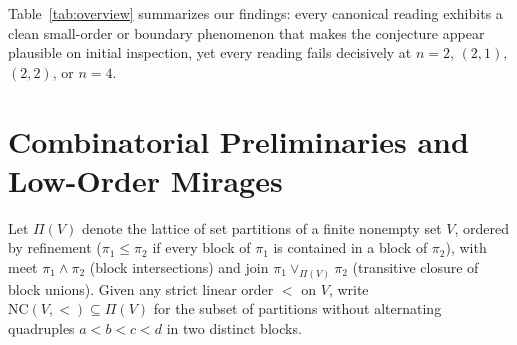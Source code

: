 \documentclass[11pt]{article}
\theoremstyle{plain}
\theoremstyle{definition}
\newcommand{\NC}{\mathrm{NC}}
\begin{document}
Table~\ref{tab:overview} summarizes our findings: every canonical reading exhibits a clean small-order or boundary phenomenon that makes the conjecture appear plausible on initial inspection, yet every reading fails decisively at $n = 2$, $(2, 1)$, $(2, 2)$, or $n = 4$.

\section{Combinatorial Preliminaries and Low-Order Mirages}

Let $\Pi(V)$ denote the lattice of set partitions of a finite nonempty set $V$, ordered by refinement ($\pi_1 \le \pi_2$ if every block of $\pi_1$ is contained in a block of $\pi_2$), with meet $\pi_1 \wedge \pi_2$ (block intersections) and join $\pi_1 \vee_{\Pi(V)} \pi_2$ (transitive closure of block unions). Given any strict linear order $<$ on $V$, write $\NC(V, <) \subseteq \Pi(V)$ for the subset of partitions without alternating quadruples $a < b < c < d$ in two distinct blocks.
\end{document}
